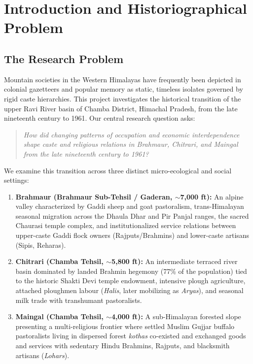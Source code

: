 \documentclass[11pt,a4paper]{article}
\begin{document}
\newpage
\tableofcontents
\newpage

\section{Introduction and Historiographical Problem}

\subsection{The Research Problem}
Mountain societies in the Western Himalayas have frequently been depicted in colonial gazetteers and popular memory as static, timeless isolates governed by rigid caste hierarchies. This project investigates the historical transition of the upper Ravi River basin of Chamba District, Himachal Pradesh, from the late nineteenth century to 1961. Our central research question asks:
\begin{quote}
\textit{How did changing patterns of occupation and economic interdependence shape caste and religious relations in Brahmaur, Chitrari, and Maingal from the late nineteenth century to 1961?}
\end{quote}

We examine this transition across three distinct micro-ecological and social settings:
\begin{enumerate}[leftmargin=*]
    \item \textbf{Brahmaur (Brahmaur Sub-Tehsil / Gaderan, $\sim$7,000 ft):} An alpine valley characterized by Gaddi sheep and goat pastoralism, trans-Himalayan seasonal migration across the Dhaula Dhar and Pir Panjal ranges, the sacred Chaurasi temple complex, and institutionalized service relations between upper-caste Gaddi flock owners (Rajputs/Brahmins) and lower-caste artisans (Sipis, Reharas).
    \item \textbf{Chitrari (Chamba Tehsil, $\sim$5,800 ft):} An intermediate terraced river basin dominated by landed Brahmin hegemony (77\% of the population) tied to the historic Shakti Devi temple endowment, intensive plough agriculture, attached ploughmen labour (\textit{Halis}, later mobilizing as \textit{Aryas}), and seasonal milk trade with transhumant pastoralists.
    \item \textbf{Maingal (Chamba Tehsil, $\sim$4,000 ft):} A sub-Himalayan forested slope presenting a multi-religious frontier where settled Muslim Gujjar buffalo pastoralists living in dispersed forest \textit{kothas} co-existed and exchanged goods and services with sedentary Hindu Brahmins, Rajputs, and blacksmith artisans (\textit{Lohars}).
\end{enumerate}
\end{document}
